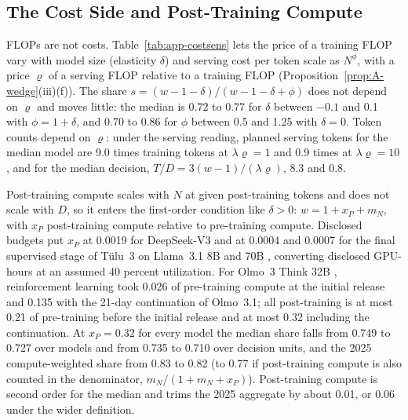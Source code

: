 

\subsection{The Cost Side and Post-Training Compute}\label{app:wedge-cost}

FLOPs are not costs. Table~\ref{tab:app-costsens} lets the price of a training FLOP vary with model size (elasticity
$\delta$) and serving cost per token scale as $N^\phi$, with a price $\varrho$ of a serving FLOP relative to a training
FLOP (Proposition~\ref{prop:A-wedge}(iii)(f)). The share $s=(w-1-\delta)/(w-1-\delta+\phi)$ does not depend on $\varrho$
and moves little: the median is 0.72 to 0.77 for $\delta$ between $-0.1$ and 0.1 with $\phi=1+\delta$, and 0.70 to 0.86
for $\phi$ between 0.5 and 1.25 with $\delta=0$. Token counts depend on $\varrho$: under the serving reading, planned
serving tokens for the median model are 9.0 times training tokens at $\lambda\varrho=1$ and 0.9 times at
$\lambda\varrho=10$, and for the median decision, $T/D=3(w-1)/(\lambda\varrho)$, 8.3 and 0.8.

Post-training compute scales with $N$ at given post-training tokens and does not scale with $D$, so it enters the
first-order condition like $\delta>0$: $w=1+x_P+m_N$, with $x_P$ post-training compute relative to pre-training compute.
Disclosed budgets put $x_P$ at 0.0019 for DeepSeek-V3 \citep{deepseekai2024deepseekv3} and at 0.0004 and 0.0007 for the
final supervised stage of T\"ulu~3 on Llama~3.1 8B and 70B \citep{lambert2024tulu3}, converting disclosed GPU-hours at an
assumed 40 percent utilization. For Olmo~3 Think 32B \citep{olmo2025olmo3}, reinforcement learning took 0.026 of
pre-training compute at the initial release and 0.135 with the 21-day continuation of Olmo~3.1; all post-training is at
most 0.21 of pre-training before the initial release and at most 0.32 including the continuation. At $x_P=0.32$ for every
model the median share falls from 0.749 to 0.727 over models and from 0.735 to 0.710 over decision units, and the 2025
compute-weighted share from 0.83 to 0.82 (to 0.77 if post-training compute is also counted in the denominator,
$m_N/(1+m_N+x_P)$). Post-training compute is second order for the median and trims the 2025 aggregate by about 0.01, or
0.06 under the wider definition.




